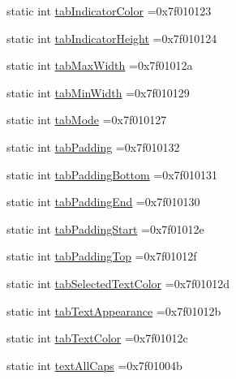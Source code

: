 \begin{DoxyCompactItemize}
\item 
static int \hyperlink{classandroid_1_1support_1_1v7_1_1recyclerview_1_1R_1_1attr_ae9184a6bb592c6fe2947aead01de41b5}{tab\+Indicator\+Color} =0x7f010123
\item 
static int \hyperlink{classandroid_1_1support_1_1v7_1_1recyclerview_1_1R_1_1attr_ab36f411b03ace9682389cb9d40b8dcb3}{tab\+Indicator\+Height} =0x7f010124
\item 
static int \hyperlink{classandroid_1_1support_1_1v7_1_1recyclerview_1_1R_1_1attr_a4b3dc8eb7824a500cfff33e6ce9f920c}{tab\+Max\+Width} =0x7f01012a
\item 
static int \hyperlink{classandroid_1_1support_1_1v7_1_1recyclerview_1_1R_1_1attr_aa3533d8314e51e3bb05c9486d3d1b14a}{tab\+Min\+Width} =0x7f010129
\item 
static int \hyperlink{classandroid_1_1support_1_1v7_1_1recyclerview_1_1R_1_1attr_a2c5653fba1bebf0aa1815e8de00d03f7}{tab\+Mode} =0x7f010127
\item 
static int \hyperlink{classandroid_1_1support_1_1v7_1_1recyclerview_1_1R_1_1attr_ace914a97043e0fdc338ed220da7a832e}{tab\+Padding} =0x7f010132
\item 
static int \hyperlink{classandroid_1_1support_1_1v7_1_1recyclerview_1_1R_1_1attr_a472b07e80eb62d601d7ec6fb237ac3ca}{tab\+Padding\+Bottom} =0x7f010131
\item 
static int \hyperlink{classandroid_1_1support_1_1v7_1_1recyclerview_1_1R_1_1attr_adc9460668cb89e53acbdd0c1ae610a46}{tab\+Padding\+End} =0x7f010130
\item 
static int \hyperlink{classandroid_1_1support_1_1v7_1_1recyclerview_1_1R_1_1attr_a6b9a1d5b325240f7cb1d059be120e899}{tab\+Padding\+Start} =0x7f01012e
\item 
static int \hyperlink{classandroid_1_1support_1_1v7_1_1recyclerview_1_1R_1_1attr_a400cf27a68fdea17480438f87a3bff8d}{tab\+Padding\+Top} =0x7f01012f
\item 
static int \hyperlink{classandroid_1_1support_1_1v7_1_1recyclerview_1_1R_1_1attr_affa0c815ddd832ba9ebad5e166e269c8}{tab\+Selected\+Text\+Color} =0x7f01012d
\item 
static int \hyperlink{classandroid_1_1support_1_1v7_1_1recyclerview_1_1R_1_1attr_a66eecedaeb90d2116d7ab5a1769d7163}{tab\+Text\+Appearance} =0x7f01012b
\item 
static int \hyperlink{classandroid_1_1support_1_1v7_1_1recyclerview_1_1R_1_1attr_ad7fb80657fe7892f83ef7b902b19ad28}{tab\+Text\+Color} =0x7f01012c
\item 
static int \hyperlink{classandroid_1_1support_1_1v7_1_1recyclerview_1_1R_1_1attr_ac10a448074b0197720ea1ee696e4c934}{text\+All\+Caps} =0x7f01004b

\end{DoxyCompactItemize}
